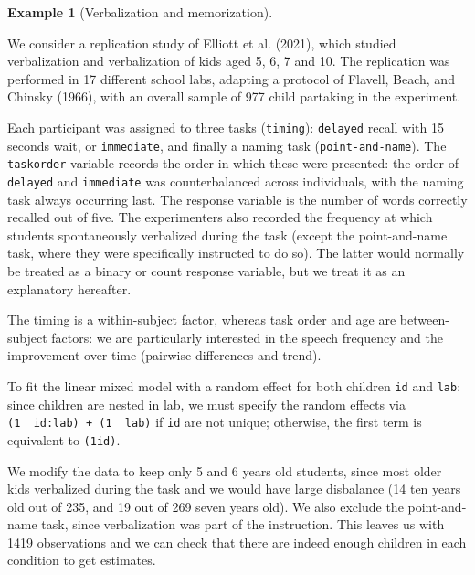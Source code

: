 \documentclass[
  11pt,
  letterpaper,
]{scrbook}
\theoremstyle{definition}
\theoremstyle{definition}
\newtheorem{example}{Example}[chapter]
\theoremstyle{remark}
\begin{document}
\begin{example}[Verbalization and
memorization]\protect\hypertarget{exm-verbalization-memorization}{}\label{exm-verbalization-memorization}

We consider a replication study of Elliott et al. (2021), which studied
verbalization and verbalization of kids aged 5, 6, 7 and 10. The
replication was performed in 17 different school labs, adapting a
protocol of Flavell, Beach, and Chinsky (1966), with an overall sample
of 977 child partaking in the experiment.

Each participant was assigned to three tasks (\texttt{timing}):
\texttt{delayed} recall with 15 seconds wait, or \texttt{immediate}, and
finally a naming task (\texttt{point-and-name}). The \texttt{taskorder}
variable records the order in which these were presented: the order of
\texttt{delayed} and \texttt{immediate} was counterbalanced across
individuals, with the naming task always occurring last. The response
variable is the number of words correctly recalled out of five. The
experimenters also recorded the frequency at which students
spontaneously verbalized during the task (except the point-and-name
task, where they were specifically instructed to do so). The latter
would normally be treated as a binary or count response variable, but we
treat it as an explanatory hereafter.

The timing is a within-subject factor, whereas task order and age are
between-subject factors: we are particularly interested in the speech
frequency and the improvement over time (pairwise differences and
trend).

To fit the linear mixed model with a random effect for both children
\texttt{id} and \texttt{lab}: since children are nested in lab, we must
specify the random effects via
\texttt{(1\ \textbar{}\ id:lab)\ +\ (1\ \textbar{}\ lab)} if \texttt{id}
are not unique; otherwise, the first term is equivalent to
\texttt{(1\textbar{}id)}.

We modify the data to keep only 5 and 6 years old students, since most
older kids verbalized during the task and we would have large disbalance
(14 ten years old out of 235, and 19 out of 269 seven years old). We
also exclude the point-and-name task, since verbalization was part of
the instruction. This leaves us with 1419 observations and we can check
that there are indeed enough children in each condition to get
estimates.


\end{example}
\end{document}

